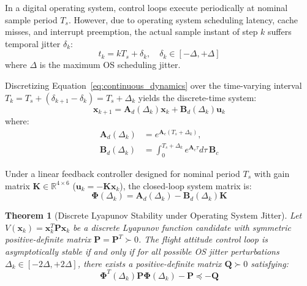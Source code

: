\documentclass[10pt,journal,compsoc,twocolumn]{article}
\newtheorem{theorem}{Theorem}
\begin{document}
In a digital operating system, control loops execute periodically at nominal sample period $T_s$. However, due to operating system scheduling latency, cache misses, and interrupt preemption, the actual sample instant of step $k$ suffers temporal jitter $\delta_k$:
\begin{equation}
t_k = k T_s + \delta_k, \quad \delta_k \in [-\Delta, +\Delta]
\end{equation}
where $\Delta$ is the maximum OS scheduling jitter.

Discretizing Equation~\eqref{eq:continuous_dynamics} over the time-varying interval $T_k = T_s + (\delta_{k+1} - \delta_k) = T_s + \Delta_k$ yields the discrete-time system:
\begin{equation}
\label{eq:discrete_system}
\mathbf{x}_{k+1} = \mathbf{A}_d(\Delta_k) \mathbf{x}_k + \mathbf{B}_d(\Delta_k) \mathbf{u}_k
\end{equation}
where:
\begin{equation}
\begin{aligned}
\mathbf{A}_d(\Delta_k) &= e^{\mathbf{A}_c (T_s + \Delta_k)}, \\
\mathbf{B}_d(\Delta_k) &= \int_0^{T_s + \Delta_k} e^{\mathbf{A}_c \tau} d\tau \, \mathbf{B}_c
\end{aligned}
\end{equation}

Under a linear feedback controller designed for nominal period $T_s$ with gain matrix $\mathbf{K} \in \mathbb{R}^{4 \times 6}$ ($\mathbf{u}_k = -\mathbf{K} \mathbf{x}_k$), the closed-loop system matrix is:
\begin{equation}
\boldsymbol{\Phi}(\Delta_k) = \mathbf{A}_d(\Delta_k) - \mathbf{B}_d(\Delta_k) \mathbf{K}
\end{equation}

\newpage

\begin{theorem}[Discrete Lyapunov Stability under Operating System Jitter]
\label{thm:stability}
Let $V(\mathbf{x}_k) = \mathbf{x}_k^T \mathbf{P} \mathbf{x}_k$ be a discrete Lyapunov function candidate with symmetric positive-definite matrix $\mathbf{P} = \mathbf{P}^T \succ 0$. The flight attitude control loop is asymptotically stable if and only if for all possible OS jitter perturbations $\Delta_k \in [-2\Delta, +2\Delta]$, there exists a positive-definite matrix $\mathbf{Q} \succ 0$ satisfying:
\begin{equation}
\boldsymbol{\Phi}^T(\Delta_k) \mathbf{P} \boldsymbol{\Phi}(\Delta_k) - \mathbf{P} \preceq -\mathbf{Q}
\end{equation}
\end{theorem}
\end{document}
